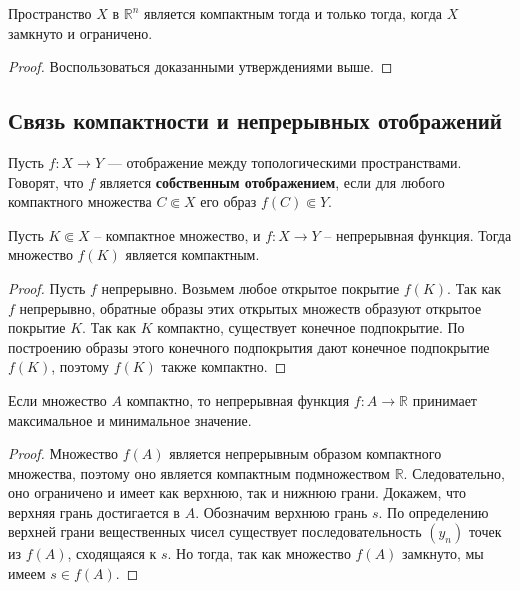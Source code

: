 \begin{theorem}
	Пространство \( X \) в \( \mathbb{R}^n \) является компактным тогда и только тогда, когда \( X \) замкнуто и ограничено.
\end{theorem}
\begin{proof}
	Воспользоваться доказанными утверждениями выше.
\end{proof}

\subsection{Связь компактности и непрерывных отображений}

\begin{definition}
	Пусть \( f : X \to Y \) — отображение между топологическими пространствами. Говорят, что \( f \) является \textbf{собственным отображением}, если для любого компактного множества \( C \Subset X \) его образ \( f(C) \Subset Y \).
\end{definition}


\begin{statement}
	Пусть \( K \Subset X \) -- компактное множество, и \( f : X \rightarrow Y \) -- непрерывная функция. Тогда множество \( f(K) \) является компактным.
\end{statement}
\begin{proof}
	Пусть \( f \) непрерывно. Возьмем любое открытое покрытие \( f(K) \). Так как \( f \) непрерывно, обратные образы этих открытых множеств образуют открытое покрытие \( K \). Так как \( K \) компактно, существует конечное подпокрытие. По построению образы этого конечного подпокрытия дают конечное подпокрытие \( f(K) \), поэтому \( f(K) \) также компактно.
\end{proof}

\begin{corollary}
	Если множество $A$ компактно, то непрерывная функция \( f : A \rightarrow \mathbb{R} \) принимает максимальное и минимальное значение.
\end{corollary}
\begin{proof}
	Множество \( f(A) \) является непрерывным образом компактного множества, поэтому оно является компактным подмножеством \( \mathbb{R} \). Следовательно, оно ограничено и имеет как верхнюю, так и нижнюю грани. Докажем, что верхняя грань достигается в \( A \). Обозначим верхнюю грань \( s \). По определению верхней грани вещественных чисел существует последовательность \( (y_n) \) точек из \( f(A) \), сходящаяся к \( s \). Но тогда, так как множество \( f(A) \) замкнуто, мы имеем \( s \in f(A) \).
\end{proof}

